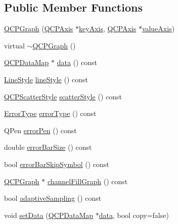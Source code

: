 \subsection*{Public Member Functions}
\begin{DoxyCompactItemize}
\item 
\hyperlink{classQCPGraph_a0393a38cf7183cbf46348eb6cf9a5a6c}{Q\+C\+P\+Graph} (\hyperlink{classQCPAxis}{Q\+C\+P\+Axis} $\ast$\hyperlink{classQCPAbstractPlottable_a72c7a09c22963f2c943f07112b311103}{key\+Axis}, \hyperlink{classQCPAxis}{Q\+C\+P\+Axis} $\ast$\hyperlink{classQCPAbstractPlottable_a3106f9d34d330a6097a8ec5905e5b519}{value\+Axis})
\item 
virtual \hyperlink{classQCPGraph_ae9998cfb9d379ac0ef3fbd6995cfbd76}{$\sim$\+Q\+C\+P\+Graph} ()
\item 
\hyperlink{qcustomplot_8h_a84a9c4a4c2216ccfdcb5f3067cda76e3}{Q\+C\+P\+Data\+Map} $\ast$ \hyperlink{classQCPGraph_a2f58436df4f86a2792b776a21642b3d9}{data} () const 
\item 
\hyperlink{classQCPGraph_ad60175cd9b5cac937c5ee685c32c0859}{Line\+Style} \hyperlink{classQCPGraph_ad6db8d31abeac256a285fc68d6b9b9be}{line\+Style} () const 
\item 
\hyperlink{classQCPScatterStyle}{Q\+C\+P\+Scatter\+Style} \hyperlink{classQCPGraph_ae0227c79f4e42a350c2c99fb2fb879db}{scatter\+Style} () const 
\item 
\hyperlink{classQCPGraph_ad23b514404bd2cb3216f57c90904d6af}{Error\+Type} \hyperlink{classQCPGraph_a250bcdf78abac87bc6d46ee6fd99a92d}{error\+Type} () const 
\item 
Q\+Pen \hyperlink{classQCPGraph_a83455e01093bb899f3b59d4a6fdcd57b}{error\+Pen} () const 
\item 
double \hyperlink{classQCPGraph_ae31efdcbc6ba3d73a7aeb83c774f958a}{error\+Bar\+Size} () const 
\item 
bool \hyperlink{classQCPGraph_a04dbc050ff04561658ab1e7f3df37a01}{error\+Bar\+Skip\+Symbol} () const 
\item 
\hyperlink{classQCPGraph}{Q\+C\+P\+Graph} $\ast$ \hyperlink{classQCPGraph_a5369f23863e04a6164f8b66d49fd18f4}{channel\+Fill\+Graph} () const 
\item 
bool \hyperlink{classQCPGraph_ad3bea28ec910eedfa9b788928d610de0}{adaptive\+Sampling} () const 
\item 
void \hyperlink{classQCPGraph_a1df2fd710545c8ba3b2c99a39a27bf8b}{set\+Data} (\hyperlink{qcustomplot_8h_a84a9c4a4c2216ccfdcb5f3067cda76e3}{Q\+C\+P\+Data\+Map} $\ast$\hyperlink{classQCPGraph_a2f58436df4f86a2792b776a21642b3d9}{data}, bool copy=false)

\end{DoxyCompactItemize}
